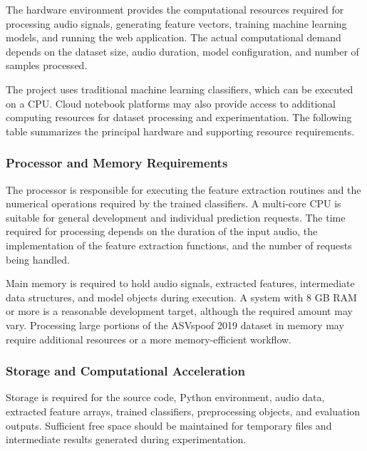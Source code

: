 \documentclass[12pt,a4paper]{report}
\begin{document}
The hardware environment provides the computational resources required for processing audio signals, generating feature vectors, training machine learning models, and running the web application. The actual computational demand depends on the dataset size, audio duration, model configuration, and number of samples processed.

The project uses traditional machine learning classifiers, which can be executed on a CPU. Cloud notebook platforms may also provide access to additional computing resources for dataset processing and experimentation. The following table summarizes the principal hardware and supporting resource requirements.
\subsubsection{Processor and Memory Requirements}

The processor is responsible for executing the feature extraction routines and the numerical operations required by the trained classifiers. A multi-core CPU is suitable for general development and individual prediction requests. The time required for processing depends on the duration of the input audio, the implementation of the feature extraction functions, and the number of requests being handled.

Main memory is required to hold audio signals, extracted features, intermediate data structures, and model objects during execution. A system with 8 GB RAM or more is a reasonable development target, although the required amount may vary. Processing large portions of the ASVspoof 2019 dataset in memory may require additional resources or a more memory-efficient workflow.

\subsubsection{Storage and Computational Acceleration}

Storage is required for the source code, Python environment, audio data, extracted feature arrays, trained classifiers, preprocessing objects, and evaluation outputs. Sufficient free space should be maintained for temporary files and intermediate results generated during experimentation.
\end{document}
